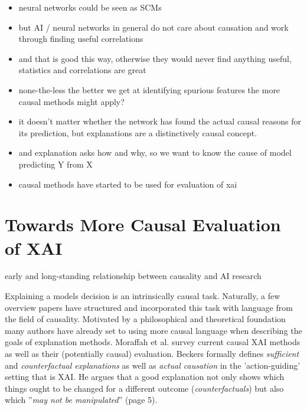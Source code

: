 \begin{itemize}
    
    \item neural networks could be seen as SCMs \cite{Chattopadhyay2019}
    \item but AI / neural networks in general do not care about causation and work through finding useful correlations
    \item and that is good this way, otherwise they would never find anything useful, statistics and correlations are great
    \item none-the-less the better we get at identifying spurious features the more causal methods might apply?
    \item it doesn't matter whether the network has found the actual causal reasons for its prediction, but explanations are a distinctively causal concept.
    \item and explanation asks how and why, so we want to know the cause of model predicting Y from X
    \item causal methods have started to be used for evaluation of xai
\end{itemize}


\section{Towards More Causal Evaluation of XAI}\label{section:causal_xai}
early and long-standing relationship between causality and AI research

Explaining a models decision is an intrinsically causal task. Naturally, a few overview papers have structured and incorporated this task with language from the field of causality. Motivated by a philosophical and theoretical foundation \cite{Woodward2004, Halpern2005, Schoelkopf2019} many authors have already set to using more causal language when describing the goals of explanation methods. Moraffah et al. \cite{Moraffah2020a} survey current causal XAI methods as well as their (potentially causal) evaluation. Beckers \cite{Beckers2022} formally defines \textit{sufficient} and \textit{counterfactual explanations} as well as \textit{actual causation} in the 'action-guiding' setting that is XAI. He argues that a good explanation not only shows which things ought to be changed for a different outcome (\textit{counterfactuals}) but also which ''\textit{may not be manipulated}'' (page 5). 


